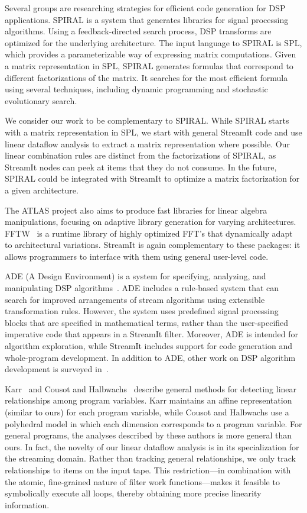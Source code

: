 \documentclass{sig-alternate}
\begin{document}
{Several groups are researching strategies for efficient code
generation for DSP applications.  SPIRAL is a system that generates
libraries for signal processing
algorithms\cite{spiral,johnson01searching,egner01automatic}.  Using a
feedback-directed search process, DSP transforms are optimized for the
underlying architecture.  The input language to SPIRAL is
SPL\cite{xiong01spl,xiong-thesis}, which provides a parameterizable
way of expressing matrix computations.  Given a matrix representation
in SPL, SPIRAL generates formulas that correspond to different
factorizations of the matrix.  It searches for the most efficient
formula using several techniques, including dynamic programming and
stochastic evolutionary search.

We consider our work to be complementary to SPIRAL.  While SPIRAL
starts with a matrix representation in SPL, we start with general
StreamIt code and use linear dataflow analysis to extract a matrix
representation where possible.  Our linear combination rules are
distinct from the factorizations of SPIRAL, as StreamIt nodes can peek
at items that they do not consume.  In the future, SPIRAL could be
integrated with StreamIt to optimize a matrix factorization for a
given architecture.

The ATLAS project \cite{whaley01automated} also aims to produce fast
libraries for linear algebra manipulations, focusing on adaptive
library generation for varying architectures.  FFTW~\cite{frigo99fast}
is a runtime library of highly optimized FFT's that dynamically adapt
to architectural variations.  StreamIt is again complementary to these
packages: it allows programmers to interface with them using general
user-level code.

ADE (A Design Environment) is a system for specifying, analyzing, and
manipulating DSP algorithms~\cite{covell-ade}.  ADE includes a
rule-based system that can search for improved arrangements of stream
algorithms using extensible transformation rules.  However, the system
uses predefined signal processing blocks that are specified in
mathematical terms, rather than the user-specified imperative code
that appears in a StreamIt filter.  Moreover, ADE is intended for
algorithm exploration, while StreamIt includes support for code
generation and whole-program development.  In addition to ADE, other
work on DSP algorithm development is surveyed
in~\cite{oppenheim-symbolic}.

Karr~\cite{karr76} and Cousot and Halbwachs~\cite{cousot78} describe
general methods for detecting linear relationships among program
variables.  Karr maintains an affine representation (similar to ours)
for each program variable, while Cousot and Halbwachs use a polyhedral
model in which each dimension corresponds to a program variable.  For
general programs, the analyses described by these authors is more
general than ours.  In fact, the novelty of our linear dataflow
analysis is in its specialization for the streaming domain.  Rather
than tracking general relationships, we only track relationships to
items on the input tape.  This restriction---in combination with the
atomic, fine-grained nature of filter work functions---makes it
feasible to symbolically execute all loops, thereby obtaining more
precise linearity information.

}
\end{document}
